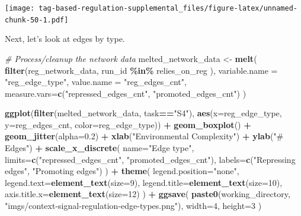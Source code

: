 \documentclass[
]{book}
\newenvironment{Shaded}{\begin{snugshade}}{\end{snugshade}}
\newcommand{\CommentTok}[1]{\textcolor[rgb]{0.56,0.35,0.01}{\textit{#1}}}
\newcommand{\DataTypeTok}[1]{\textcolor[rgb]{0.13,0.29,0.53}{#1}}
\newcommand{\DecValTok}[1]{\textcolor[rgb]{0.00,0.00,0.81}{#1}}
\newcommand{\FloatTok}[1]{\textcolor[rgb]{0.00,0.00,0.81}{#1}}
\newcommand{\KeywordTok}[1]{\textcolor[rgb]{0.13,0.29,0.53}{\textbf{#1}}}
\newcommand{\NormalTok}[1]{#1}
\newcommand{\OperatorTok}[1]{\textcolor[rgb]{0.81,0.36,0.00}{\textbf{#1}}}
\newcommand{\StringTok}[1]{\textcolor[rgb]{0.31,0.60,0.02}{#1}}
\begin{document}
\texttt{[image: tag-based-regulation-supplemental\_files/figure-latex/unnamed-chunk-50-1.pdf]}

Next, let's look at edges by type.

\begin{Shaded}
\begin{Highlighting}[]
\CommentTok{\# Process/cleanup the network data}
\NormalTok{melted\_network\_data \textless{}{-}}\StringTok{ }\KeywordTok{melt}\NormalTok{(}
  \KeywordTok{filter}\NormalTok{(reg\_network\_data,}
\NormalTok{         run\_id }\OperatorTok{\%in\%}\StringTok{ }\NormalTok{relies\_on\_reg}
\NormalTok{        ),}
  \DataTypeTok{variable.name =} \StringTok{"reg\_edge\_type"}\NormalTok{,}
  \DataTypeTok{value.name =} \StringTok{"reg\_edges\_cnt"}\NormalTok{,}
  \DataTypeTok{measure.vars=}\KeywordTok{c}\NormalTok{(}\StringTok{"repressed\_edges\_cnt"}\NormalTok{, }\StringTok{"promoted\_edges\_cnt"}\NormalTok{)}
\NormalTok{)}

\KeywordTok{ggplot}\NormalTok{(}\KeywordTok{filter}\NormalTok{(melted\_network\_data, task}\OperatorTok{==}\StringTok{"S4"}\NormalTok{), }\KeywordTok{aes}\NormalTok{(}\DataTypeTok{x=}\NormalTok{reg\_edge\_type, }\DataTypeTok{y=}\NormalTok{reg\_edges\_cnt, }\DataTypeTok{color=}\NormalTok{reg\_edge\_type)) }\OperatorTok{+}
\StringTok{  }\KeywordTok{geom\_boxplot}\NormalTok{() }\OperatorTok{+}
\StringTok{  }\KeywordTok{geom\_jitter}\NormalTok{(}\DataTypeTok{alpha=}\FloatTok{0.2}\NormalTok{) }\OperatorTok{+}
\StringTok{  }\KeywordTok{xlab}\NormalTok{(}\StringTok{"Environmental Complexity"}\NormalTok{) }\OperatorTok{+}
\StringTok{  }\KeywordTok{ylab}\NormalTok{(}\StringTok{"\# Edges"}\NormalTok{) }\OperatorTok{+}
\StringTok{  }\KeywordTok{scale\_x\_discrete}\NormalTok{(}
    \DataTypeTok{name=}\StringTok{"Edge type"}\NormalTok{,}
    \DataTypeTok{limits=}\KeywordTok{c}\NormalTok{(}\StringTok{"repressed\_edges\_cnt"}\NormalTok{, }\StringTok{"promoted\_edges\_cnt"}\NormalTok{),}
    \DataTypeTok{labels=}\KeywordTok{c}\NormalTok{(}\StringTok{"Repressing edges"}\NormalTok{, }\StringTok{"Promoting edges"}\NormalTok{)}
\NormalTok{  ) }\OperatorTok{+}
\StringTok{  }\KeywordTok{theme}\NormalTok{(}
    \DataTypeTok{legend.position=}\StringTok{"none"}\NormalTok{,}
    \DataTypeTok{legend.text=}\KeywordTok{element\_text}\NormalTok{(}\DataTypeTok{size=}\DecValTok{9}\NormalTok{),}
    \DataTypeTok{legend.title=}\KeywordTok{element\_text}\NormalTok{(}\DataTypeTok{size=}\DecValTok{10}\NormalTok{),}
    \DataTypeTok{axis.title.x=}\KeywordTok{element\_text}\NormalTok{(}\DataTypeTok{size=}\DecValTok{12}\NormalTok{)}
\NormalTok{  ) }\OperatorTok{+}
\StringTok{  }\KeywordTok{ggsave}\NormalTok{(}
    \KeywordTok{paste0}\NormalTok{(working\_directory, }\StringTok{"imgs/context{-}signal{-}regulation{-}edge{-}types.png"}\NormalTok{),}
    \DataTypeTok{width=}\DecValTok{4}\NormalTok{,}
    \DataTypeTok{height=}\DecValTok{3}
\NormalTok{  )}
\end{Highlighting}
\end{Shaded}
\end{document}
